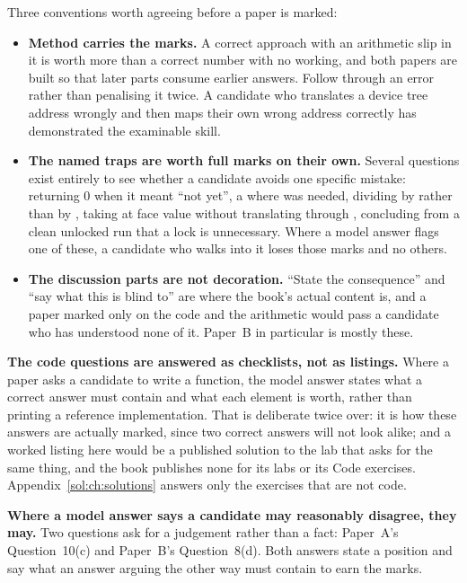 Three conventions worth agreeing before a paper is marked:
\begin{itemize}
  \item \textbf{Method carries the marks.} A correct approach with an arithmetic slip in it is worth
    more than a correct number with no working, and both papers are built so that later parts
    consume earlier answers. Follow through an error rather than penalising it twice. A candidate
    who translates a device tree address wrongly and then maps their own wrong address correctly has
    demonstrated the examinable skill.
  \item \textbf{The named traps are worth full marks on their own.} Several questions exist entirely
    to see whether a candidate avoids one specific mistake:  returning 0 when it meant
    ``not yet'', a  where  was needed, dividing  by
     rather than by , taking  at face value without translating
    through , concluding from a clean unlocked run that a lock is unnecessary. Where a
    model answer flags one of these, a candidate who walks into it loses those marks and no others.
  \item \textbf{The discussion parts are not decoration.} ``State the consequence'' and ``say what
    this is blind to'' are where the book's actual content is, and a paper marked only on the code
    and the arithmetic would pass a candidate who has understood none of it. Paper~B in particular
    is mostly these.
\end{itemize}

\textbf{The code questions are answered as checklists, not as listings.} Where a paper asks a
candidate to write a function, the model answer states what a correct answer must contain and what
each element is worth, rather than printing a reference implementation. That is deliberate twice
over: it is how these answers are actually marked, since two correct answers will not look alike;
and a worked listing here would be a published solution to the lab that asks for the same thing,
and the book publishes none for its labs or its Code exercises. Appendix~\ref{sol:ch:solutions}
answers only the exercises that are not code.

\textbf{Where a model answer says a candidate may reasonably disagree, they may.} Two questions ask
for a judgement rather than a fact: Paper~A's Question~10(c) and Paper~B's Question~8(d). Both
answers state a position and say what an answer arguing the other way must contain to earn the
marks.
